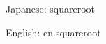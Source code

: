 \documentclass{article}
\begin{document}
Japanese: \gls{squareroot}

English: \gls{en.squareroot}

\printunsrtglossaries
\end{document}
